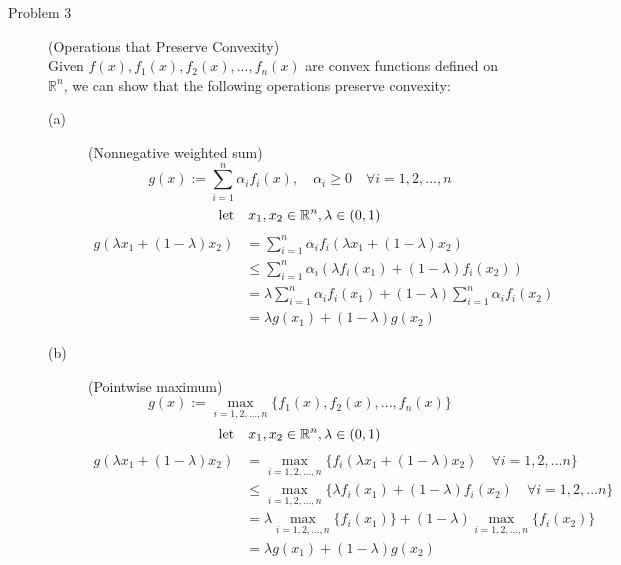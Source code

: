 \documentclass[11pt]{article}
\begin{document}
\begin{description}
\item[Problem 3]  (Operations that Preserve Convexity) \\
Given $f(x), f_1(x), f_2(x), ..., f_n(x)$ are convex functions defined on $\mathbb{R}^n$, we can show that the following operations preserve convexity:
\begin{description}
    \item[(a)] (Nonnegative weighted sum)
    \begin{equation*}
        g(x):= \sum_{i=1}^{n} \alpha_i f_i(x), \quad \alpha_i \geq 0 \quad \forall i = 1, 2, ..., n
    \end{equation*}
    \begin{equation*}
        \text{let} \quad x_1,x_2 \in \mathbb{R}^n, \lambda \in (0,1) \\
    \end{equation*}
    \begin{equation*}
        \begin{aligned}
            g(\lambda x_1 + (1-\lambda)x_2) 
            &= \sum_{i=1}^{n} \alpha_i f_i(\lambda x_1 + (1-\lambda)x_2) \\
            &\leq \sum_{i=1}^{n} \alpha_i (\lambda f_i(x_1) + (1-\lambda)f_i(x_2)) \\
            &= \lambda \sum_{i=1}^{n} \alpha_i f_i(x_1) + (1-\lambda) \sum_{i=1}^{n} \alpha_i f_i(x_2) \\
            &= \lambda g(x_1) + (1-\lambda) g(x_2)
        \end{aligned}
    \end{equation*}

    \item[(b)] (Pointwise maximum)
    \begin{equation*}
        g(x):= \max_{i=1,2,...,n} \{f_1(x), f_2(x), ..., f_n(x)\}
    \end{equation*}
    \begin{equation*}
        \text{let} \quad x_1,x_2 \in \mathbb{R}^n, \lambda \in (0,1) \\
    \end{equation*}
    \begin{equation*}
        \begin{aligned}
            g(\lambda x_1 + (1-\lambda)x_2)
            &= \max_{i=1,2,...,n} \{f_i(\lambda x_1 + (1-\lambda)x_2) \quad \forall i=1,2,...n\} \\
            &\leq \max_{i=1,2,...,n} \{\lambda f_i(x_1) + (1-\lambda) f_i(x_2) \quad \forall i=1,2,...n\} \\
            &= \lambda \max_{i=1,2,...,n} \{f_i(x_1)\} + (1-\lambda) \max_{i=1,2,...,n} \{f_i(x_2)\} \\
            &= \lambda g(x_1) + (1-\lambda) g(x_2)
        \end{aligned}
    \end{equation*}


\end{description}
\end{description}
\end{document}
